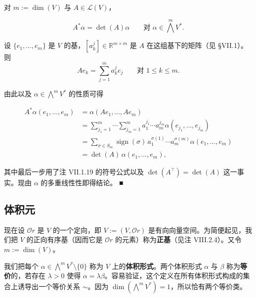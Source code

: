 \begin{proposition}

对 $ m := \dim(V) $ 与 $ A \in \mathcal{L}(V) $，

\[
A^{*}\alpha = \det(A)\alpha \qquad \text{对 } \alpha \in \bigwedge^{m}V^{*} .
\]

\proofhead
设 $ \{e_{1},\ldots,e_{m}\} $ 是 $ V $ 的基，$ [a_{k}^{j}] \in \mathbb{R}^{m\times m} $ 是 $ A $ 在这组基下的矩阵（见 §VII.1）。则
\[
Ae_{k} = \sum_{j=1}^{m} a_{k}^{j}e_{j} \qquad \text{对 } 1 \le k \le m .
\]

由此以及 $ \alpha \in \bigwedge^{m}V^{*} $ 的性质可得

\begin{equation*}
\begin{aligned}
A^{*}\alpha(e_{1},\ldots,e_{m}) &= \alpha(Ae_{1},\ldots,Ae_{m}) \\ &= \sum_{j_{1}=1}^{m}\cdots\sum_{j_{m}=1}^{m} a_{1}^{j_{1}}\cdots a_{m}^{j_{m}}\alpha(e_{j_{1}},\ldots,e_{j_{m}}) \\ &= \sum_{\sigma \in S_{m}} \operatorname{sign}(\sigma)\, a_{1}^{\sigma(1)}\cdots a_{m}^{\sigma(m)}\alpha(e_{1},\ldots,e_{m}) \\ &= \det(A)\,\alpha(e_{1},\ldots,e_{m}) ,
\end{aligned}
\end{equation*}

其中最后一步用了注 VII.1.19 的符号公式以及 $ \det(A^{\top}) = \det(A) $ 这一事实。现由 $ \alpha $ 的多重线性性即得结论。 \nobreak\hspace{0.35em}■

\end{proposition}

\subsection*{体积元}

现在设 $ \mathcal{O}r $ 是 $ V $ 的一个定向，即 $ V := (V, \mathcal{O}r) $ 是有向向量空间。为简便起见，我们把 $ V $ 的正向有序基（因而它是 $ \mathcal{O}r $ 的元素）称为\textbf{正基}（见注 VIII.2.4）。又令 $ m := \dim(V) $。

我们把每个 $ \alpha \in \bigwedge^{m}V^{*}\setminus\{0\} $ 称为 $ V $ 上的\textbf{体积形式}。两个体积形式 $ \alpha $ 与 $ \beta $ 称为\textbf{等价}的，若存在 $ \lambda > 0 $ 使得 $ \alpha = \lambda\beta $。容易验证，这个定义在所有体积形式构成的集合上诱导出一个等价关系 $ \sim $。因为 $ \dim(\bigwedge^{m}V^{*}) = 1 $，所以恰有两个等价类。

